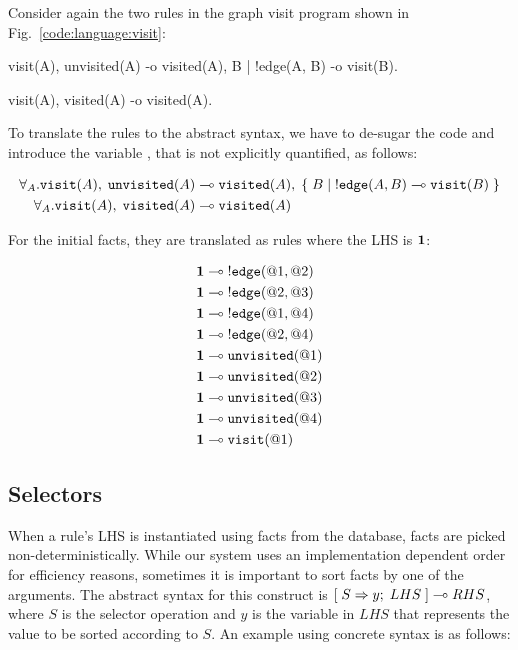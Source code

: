 Consider again the two rules in the graph visit program shown in
Fig.~\ref{code:language:visit}:

\nopagebreak

\begin{Code}
visit(A),
unvisited(A)
   -o visited(A),
      {B | !edge(A, B) -o visit(B)}.

visit(A),
visited(A)
   -o visited(A).
\end{Code}

To translate the rules to the abstract syntax, we have to de-sugar the code and
introduce the variable , that is not explicitly quantified, as follows:

\nopagebreak

\begin{align}
\forall_A. \mathtt{visit}(A), \; \mathtt{unvisited}(A) \multimap & \;
\mathtt{visited}(A), \; \{ \; B \; | \; {!}\mathtt{edge}(A, B) \multimap \mathtt{visit}(B) \; \}\\
\forall_A. \mathtt{visit}(A), \; \mathtt{visited}(A) \multimap & \;
\mathtt{visited}(A)
\end{align}

For the initial facts, they are translated as rules where the LHS is $\mathbf{1}$:

\nopagebreak

\begin{align}
\mathbf{1} \multimap \; & {!} \mathtt{edge}(@1, @2) \\
\mathbf{1} \multimap \; & {!} \mathtt{edge}(@2, @3) \\
\mathbf{1} \multimap \; & {!} \mathtt{edge}(@1, @4) \\
\mathbf{1} \multimap \; & {!} \mathtt{edge}(@2, @4) \\
\mathbf{1} \multimap \; & \mathtt{unvisited}(@1)  \\
\mathbf{1} \multimap \; & \mathtt{unvisited}(@2) \\
\mathbf{1} \multimap \; & \mathtt{unvisited}(@3) \\
\mathbf{1} \multimap \; & \mathtt{unvisited}(@4) \\
\mathbf{1} \multimap \; & \mathtt{visit}(@1)
\end{align}

\subsection{Selectors}\label{section:language:selector}

When a rule's LHS is instantiated using facts from the database, facts are
picked non-deterministically. While our system uses an implementation dependent
order for efficiency reasons, sometimes it is important to sort facts by one of
the arguments. The abstract syntax for this construct is
$[\; S \Rightarrow y; \; LHS \;] \multimap RHS$, where $S$ is the selector operation and $y$ is the
variable in $LHS$ that represents the value to be sorted according to $S$. An
example using concrete syntax is as follows:

